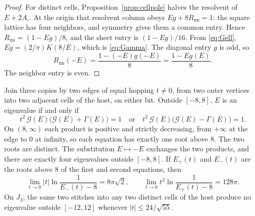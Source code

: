 \begin{proof}
For distinct cells, Proposition~\ref{prop:cellpole} halves the resolvent
of \(E+2A_\square\).
At the origin that resolvent column obeys
\(E g+8 R_{\mathrm{nn}}=1\): the square lattice has four neighbors, and
symmetry gives them a common entry.
Hence \(R_{\mathrm{nn}}=(1-Eg)/8\), and the sheet entry is
\((1-Eg)/16\).
From \eqref{eq:Gell}, \(Eg=(2/\pi)K(8/E)\), which is \eqref{eq:Gamma}.
The diagonal entry \(g\) is odd, so
\[
R_{\mathrm{nn}}(-E)
=\frac{1-(-E)g(-E)}{8}
=\frac{1-Eg(E)}{8}.
\]
The neighbor entry is even.
\end{proof}

\begin{proposition}
\label{prop:adj}
Join three copies by two edges of equal hopping \(t\neq 0\), from two
outer vertices into two adjacent cells of the host, on either bit.
Outside \([-8,8]\), \(E\) is an eigenvalue if and only if
\begin{equation}
\label{eq:adj}
t^2\,\mathcal{G}(E)\bigl(\mathcal{G}(E)+\Gamma(E)\bigr)=1
\quad\text{or}\quad
t^2\,\mathcal{G}(E)\bigl(\mathcal{G}(E)-\Gamma(E)\bigr)=1.
\end{equation}
On \((8,\infty)\) each product is positive and strictly decreasing, from
\(+\infty\) at the edge to \(0\) at infinity, so each equation has exactly
one root above \(8\).
The two roots are distinct.
The substitution \(E\mapsto -E\) exchanges the two products, and there are
exactly four eigenvalues outside \([-8,8]\).
If \(E_+(t)\) and \(E_-(t)\) are the roots above \(8\) of the first and
second equations, then
\begin{equation}
\label{eq:adjlog}
\lim_{t\to 0}
|t|\ln\frac{1}{E_-(t)-8}
=8\pi\sqrt{2},
\qquad
\lim_{t\to 0}
t^2\ln\frac{1}{E_+(t)-8}
=128\pi.
\end{equation}
On \(J_3\), the same two stitches into any two distinct cells of the host
produce no eigenvalue outside \([-12,12]\) whenever
\(|t|\le 24/\sqrt{55}\).
\end{proposition}

